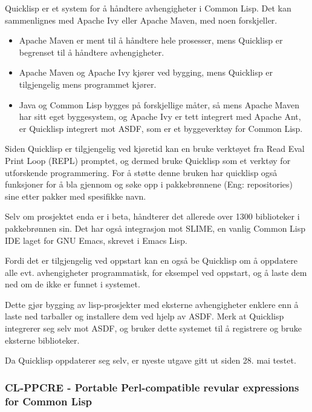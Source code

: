 \documentclass[11pt]{article}
\begin{document}
Quicklisp er et system for å håndtere avhengigheter i Common Lisp. Det kan sammenlignes med Apache Ivy eller Apache Maven, med noen forskjeller.




\begin{itemize}
\item Apache Maven er ment til å håndtere hele prosesser, mens Quicklisp er begrenset til å håndtere avhengigheter.
\item Apache Maven og Apache Ivy kjører ved bygging, mens Quicklisp er tilgjengelig mens programmet kjører.
\item Java og Common Lisp bygges på forskjellige måter, så mens Apache Maven har sitt eget byggesystem, og Apache Ivy er tett integrert med Apache Ant, er Quicklisp integrert mot ASDF, som er et byggeverktøy for Common Lisp.
\end{itemize}




Siden Quicklisp er tilgjengelig ved kjøretid kan en bruke verktøyet fra Read Eval Print Loop (REPL) promptet, og dermed bruke Quicklisp som et verktøy for utforskende programmering. For å støtte denne bruken har quicklisp også funksjoner for å bla gjennom og søke opp i pakkebrønnene (Eng: repositories) sine etter pakker med spesifikke navn. 



Selv om prosjektet enda er i beta, håndterer det allerede over 1300 biblioteker i pakkebrønnen sin.
Det har også integrasjon mot SLIME, en vanlig Common Lisp IDE laget for GNU Emacs, skrevet i Emacs Lisp.



Fordi det er tilgjengelig ved oppstart kan en også be Quicklisp om å oppdatere alle evt. avhengigheter programmatisk, for eksempel ved oppstart, og å laste dem ned om de ikke er funnet i systemet.



Dette gjør bygging av lisp-prosjekter med eksterne avhengigheter enklere enn å laste ned tarballer og installere dem ved hjelp av ASDF. Merk at Quicklisp integrerer seg selv mot ASDF, og bruker dette systemet til å registrere og bruke eksterne biblioteker.



Da Quicklisp oppdaterer seg selv, er nyeste utgave gitt ut siden 28. mai testet.



\subsubsection{CL-PPCRE - Portable Perl-compatible revular expressions for Common Lisp}
\end{document}
